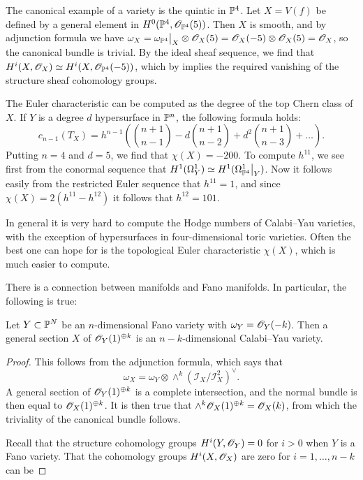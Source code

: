 \begin{example}
The canonical example of a \CY variety is the quintic in $\P^4$. Let $X=V(f)$ be defined by a general element in $H^0(\P^4,\OO_{\P^4}(5))$. Then $X$ is smooth, and by adjunction formula we have $\omega_X = \restr{\omega_{\P^4}}{X} \otimes \OO_X(5)=\OO_X(-5) \otimes \OO_X(5) = \OO_X$, so the canonical bundle is trivial. By the ideal sheaf sequence, we find that $H^i(X,\OO_X) \simeq H^i(X,\OO_{\P^4}(-5))$, which by \cite[Theorem 5.1, Chapter III]{hartshorne} implies the required vanishing of the structure sheaf cohomology groups.

The Euler characteristic can be computed as the degree of the top Chern class of $X$. If $Y$ is a degree $d$ hypersurface in $\P^n$, the following formula holds:
$$
c_{n-1}(T_X) = h^{n-1} \left( \binom{n+1}{n-1} - d \binom{n+1}{n-2} + d^2 \binom{n+1}{n-3} + \ldots\right).
$$
Putting $n=4$ and $d=5$, we find that $\chi(X)=-200$. To compute $h^{11}$, we see first from the conormal sequence that $H^1(\Omega_Y^1) \simeq H^1(\restr{\Omega_{\P^4}^1}{Y})$. Now it follows easily from the restricted Euler sequence that $h^{11}=1$, and since $\chi(X)=2(h^{11}-h^{12})$ it follows that $h^{12}=101$.
\end{example}

In general it is very hard to compute the Hodge numbers of Calabi--Yau varieties, with the exception of hypersurfaces in four-dimensional toric varieties. Often the best one can hope for is the topological Euler characteristic $\chi(X)$, which is much easier to compute.

There is a connection between \CY manifolds and Fano manifolds. In particular, the following is true:

\begin{proposition}
\label{prop:anticanonicalsection}
Let $Y \subset \P^N$ be an $n$-dimensional Fano variety with $\omega_Y=\OO_Y(-k)$. Then a general section $X$ of $\OO_Y(1)^{\oplus k}$ is an $n-k$-dimensional Calabi--Yau variety.
\end{proposition}
\begin{proof}
This follows from the adjunction formula, which says that
$$
\omega_X = \omega_Y \otimes \wedge^k (\mathcal I_X /\mathcal I_X^2)^\vee.
$$
A general section of $\OO_Y(1)^{\oplus k}$ is a complete intersection, and the normal bundle is then equal to $\OO_X(1)^{\oplus k}$. It is then true that $\wedge^k \OO_X(1)^{\oplus k} = \OO_X(k)$, from which the triviality of the canonical bundle follows.

Recall that the structure cohomology groups $H^i(Y,\OO_Y)=0$ for $ i> 0$ when $Y$ is a Fano variety. That the cohomology groups $H^i(X,\OO_X)$ are zero for $i=1,\ldots,n-k$ can be 
\end{proof}

